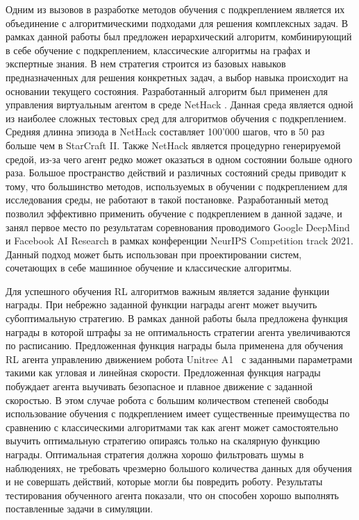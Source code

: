 Одним из вызовов в разработке методов обучения с подкреплением является их объединение с алгоритмическими подходами для решения комплексных задач. В рамках данной работы был предложен иерархический алгоритм, комбинирующий в себе обучение с подкреплением, классические алгоритмы на графах и экспертные знания. В нем стратегия строится из базовых навыков предназначенных для решения конкретных задач, а выбор навыка происходит на основании текущего состояния. 
Разработанный алгоритм был применен для управления виртуальным агентом в среде NetHack \cite{nethack}. Данная среда является одной из наиболее сложных тестовых сред для алгоритмов обучения с подкреплением. Средняя длинна эпизода в NetHack составляет 100'000 шагов, что в 50 раз больше чем в StarCraft II. Также NetHack является процедурно генерируемой средой, из-за чего агент редко может оказаться в одном состоянии больше одного раза. Большое пространство действий и различных состояний среды приводит к тому, что большинство методов, используемых в обучении с подкреплением для исследования среды, не работают в такой постановке. Разработанный метод позволил эффективно применить обучение с подкреплением в данной задаче, и занял первое место по результатам соревнования проводимого Google DeepMind и Facebook AI Research в рамках конференции NeurIPS Competition track 2021. Данный подход может быть использован при проектировании систем, сочетающих в себе машинное обучение и классические алгоритмы. 

Для успешного обучения RL алгоритмов важным является задание функции награды. При небрежно заданной функции награды агент может выучить субоптимальную стратегию. В рамках данной работы была предложена функция награды в которой штрафы за не оптимальность стратегии агента увеличиваются по расписанию. Предложенная функция награды была применена для обучения RL агента управлению движением робота Unitree A1~\cite{unitree} с заданными параметрами такими как угловая и линейная скорости. Предложенная функция награды побуждает агента выучивать безопасное и плавное движение с заданной скоростью. В этом случае робота с большим количеством степеней свободы использование обучения с подкреплением имеет существенные преимущества по сравнению с классическими алгоритмами так как агент может самостоятельно выучить оптимальную стратегию опираясь только на скалярную функцию награды. Оптимальная стратегия должна хорошо фильтровать шумы в наблюдениях, не требовать чрезмерно большого количества данных для обучения и не совершать действий, которые могли бы повредить роботу. Результаты тестирования обученного агента показали, что он способен хорошо выполнять поставленные задачи в симуляции.


